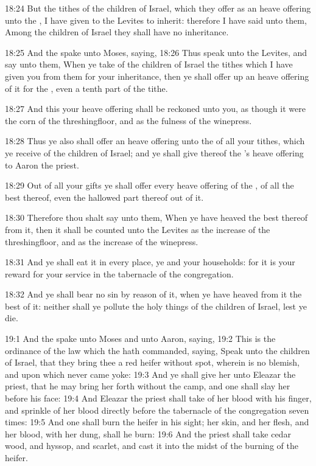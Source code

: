 18:24 But the tithes of the children of Israel, which they offer as an
heave offering unto the \LORD, I have given to the Levites to inherit:
therefore I have said unto them, Among the children of Israel they
shall have no inheritance.

18:25 And the \LORD spake unto Moses, saying, 18:26 Thus speak unto the
Levites, and say unto them, When ye take of the children of Israel the
tithes which I have given you from them for your inheritance, then ye
shall offer up an heave offering of it for the \LORD, even a tenth part
of the tithe.

18:27 And this your heave offering shall be reckoned unto you, as
though it were the corn of the threshingfloor, and as the fulness of
the winepress.

18:28 Thus ye also shall offer an heave offering unto the \LORD of all
your tithes, which ye receive of the children of Israel; and ye shall
give thereof the \LORD's heave offering to Aaron the priest.

18:29 Out of all your gifts ye shall offer every heave offering of the
\LORD, of all the best thereof, even the hallowed part thereof out of
it.

18:30 Therefore thou shalt say unto them, When ye have heaved the best
thereof from it, then it shall be counted unto the Levites as the
increase of the threshingfloor, and as the increase of the winepress.

18:31 And ye shall eat it in every place, ye and your households: for
it is your reward for your service in the tabernacle of the
congregation.

18:32 And ye shall bear no sin by reason of it, when ye have heaved
from it the best of it: neither shall ye pollute the holy things of
the children of Israel, lest ye die.

19:1 And the \LORD spake unto Moses and unto Aaron, saying, 19:2 This
is the ordinance of the law which the \LORD hath commanded, saying,
Speak unto the children of Israel, that they bring thee a red heifer
without spot, wherein is no blemish, and upon which never came yoke:
19:3 And ye shall give her unto Eleazar the priest, that he may bring
her forth without the camp, and one shall slay her before his face:
19:4 And Eleazar the priest shall take of her blood with his finger,
and sprinkle of her blood directly before the tabernacle of the
congregation seven times: 19:5 And one shall burn the heifer in his
sight; her skin, and her flesh, and her blood, with her dung, shall he
burn: 19:6 And the priest shall take cedar wood, and hyssop, and
scarlet, and cast it into the midst of the burning of the heifer.

